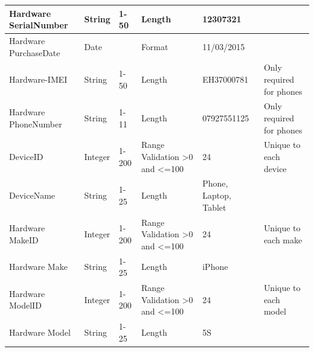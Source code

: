 \begin{center}
\begin{longtable}{|p{2cm}|p{1.14cm}|p{1.1cm}|p{1.7cm}|p{1.7cm}|p{2cm}|}
Hardware SerialNumber                & String                                  & 1-50                                 & Length                                   & 12307321              &                       \\ \hline
Hardware PurchaseDate                & Date                                  &                                  & Format                                   & 11/03/2015              &                       \\ \hline
Hardware-IMEI                & String                                  &          1-50                        & Length                                   & EH37000781               & Only required for phones                      \\ \hline
Hardware PhoneNumber                & String                                  &1-11                                  & Length                                   & 07927551125              &   Only required for phones                      \\ \hline
DeviceID                      & Integer                                  & 1-200                                & Range Validation \textgreater0 and \textless=100                                   & 24                 & Unique to each device                       \\ \hline
DeviceName                        & String                                  & 1-25                                 & Length                                   & Phone, Laptop, Tablet                &                       \\ \hline
Hardware MakeID                      & Integer                                  & 1-200                                & Range Validation \textgreater0 and \textless=100                                   & 24                 & Unique to each make                       \\ \hline
Hardware Make                        & String                                  & 1-25                                 & Length                                   & iPhone                &                       \\ \hline
Hardware ModelID		& Integer                                  & 1-200                                & Range Validation \textgreater0 and \textless=100                                   & 24                 & Unique to each model                       \\ \hline
Hardware Model                       & String                                  & 1-25                                 & Length                                   & 5S                    &                       \\ \hline

\end{longtable}
\end{center}
